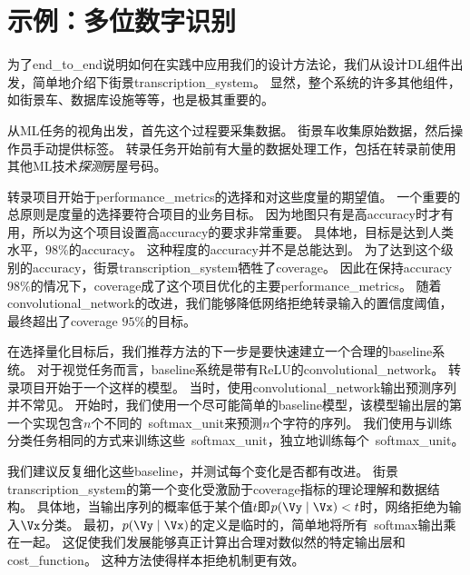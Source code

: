 
\section{示例：多位数字识别}
\label{sec:example_multi_digit_number_recognition}
为了\gls{end_to_end}说明如何在实践中应用我们的设计方法论，我们从设计\gls{DL}组件出发，简单地介绍下街景\gls{transcription_system}。
显然，整个系统的许多其他组件，如街景车、数据库设施等等，也是极其重要的。


从\gls{ML}任务的视角出发，首先这个过程要采集数据。
街景车收集原始数据，然后操作员手动提供标签。
转录任务开始前有大量的数据处理工作，包括在转录前使用其他\gls{ML}技术\emph{探测}房屋号码。


转录项目开始于\gls{performance_metrics}的选择和对这些度量的期望值。
一个重要的总原则是度量的选择要符合项目的业务目标。
因为地图只有是高\gls{accuracy}时才有用，所以为这个项目设置高\gls{accuracy}的要求非常重要。
具体地，目标是达到人类水平，$98\%$的\gls{accuracy}。
这种程度的\gls{accuracy}并不是总能达到。
为了达到这个级别的\gls{accuracy}，街景\gls{transcription_system}牺牲了\gls{coverage}。
因此在保持\gls{accuracy} $98\%$的情况下，\gls{coverage}成了这个项目优化的主要\gls{performance_metrics}。
随着\gls{convolutional_network}的改进，我们能够降低网络拒绝转录输入的置信度阈值，最终超出了\gls{coverage} $95\%$的目标。


在选择量化目标后，我们推荐方法的下一步是要快速建立一个合理的\gls{baseline}系统。
对于视觉任务而言，\gls{baseline}系统是带有\gls{ReLU}的\gls{convolutional_network}。
转录项目开始于一个这样的模型。
当时，使用\gls{convolutional_network}输出预测序列并不常见。
开始时，我们使用一个尽可能简单的\gls{baseline}模型，该模型输出层的第一个实现包含$n$个不同的~\gls{softmax_unit}来预测$n$个字符的序列。
我们使用与训练分类任务相同的方式来训练这些~\gls{softmax_unit}，独立地训练每个~\gls{softmax_unit}。


我们建议反复细化这些\gls{baseline}，并测试每个变化是否都有改进。
街景\gls{transcription_system}的第一个变化受激励于\gls{coverage}指标的理论理解和数据结构。
具体地，当输出序列的概率低于某个值$t$即$p(\Vy\mid\Vx) < t$时，网络拒绝为输入$\Vx$分类。
最初，$p(\Vy\mid\Vx)$的定义是临时的，简单地将所有~\gls{softmax}输出乘在一起。
这促使我们发展能够真正计算出合理对数似然的特定输出层和\gls{cost_function}。%
这种方法使得样本拒绝机制更有效。


